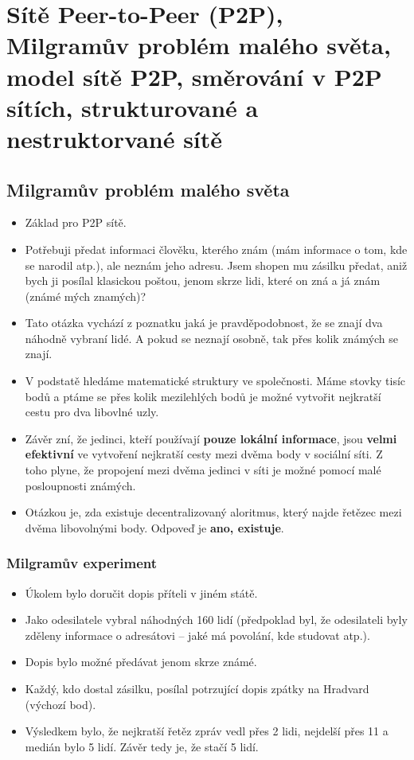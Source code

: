 \documentclass[11pt,a4paper]{article}
\begin{document}
 \sloppy
\titlepageandcontents

\section{Sítě Peer-to-Peer (P2P), Milgramův problém malého světa, model sítě P2P, směrování v P2P
sítích, strukturované a nestruktorvané sítě}
\subsection{Milgramův problém malého světa}
\begin{itemize}
\item Základ pro P2P sítě.
\item Potřebuji předat informaci člověku, kterého znám (mám informace o tom, kde se narodil atp.), ale neznám jeho adresu. Jsem shopen mu zásilku předat, aniž bych ji posílal klasickou poštou, jenom skrze lidi, které on zná a já znám (známé mých znamých)? 
\item Tato otázka vychází z poznatku jaká je pravděpodobnost, že se znají dva náhodně vybraní lidé. A pokud se neznají osobně, tak přes kolik známých se znají.
\item V podstatě hledáme matematické struktury ve společnosti. Máme stovky tisíc bodů a ptáme se přes kolik mezilehlých bodů je možné vytvořit nejkratší cestu pro dva libovlné uzly.
\item Závěr zní, že jedinci, kteří používají \textbf{pouze lokální informace}, jsou \textbf{velmi efektivní} ve vytvoření nejkratší cesty mezi dvěma body v sociální síti. Z toho plyne, že propojení mezi dvěma jedinci v síti je možné pomocí malé posloupnosti známých.
\item Otázkou je, zda existuje decentralizovaný aloritmus, který najde řetězec mezi dvěma libovolnými body. Odpoveď je \textbf{ano, existuje}.
\end{itemize}
\subsubsection{Milgramův experiment}
\begin{itemize}
\item Úkolem bylo doručit dopis příteli v jiném státě.
\item Jako odesilatele vybral náhodných 160 lidí (předpoklad byl, že odesilateli byly zděleny informace o adresátovi -- jaké má povolání, kde studovat atp.).
\item Dopis bylo možné předávat jenom skrze známé.
\item Každý, kdo dostal zásilku, posílal potrzující dopis zpátky na Hradvard (výchozí bod).
\item Výsledkem bylo, že nejkratší řetěz zpráv vedl přes 2 lidi, nejdelší přes 11 a medián bylo 5 lidí. Závěr tedy je, že stačí 5 lidí.
\end{itemize}
\end{document}

